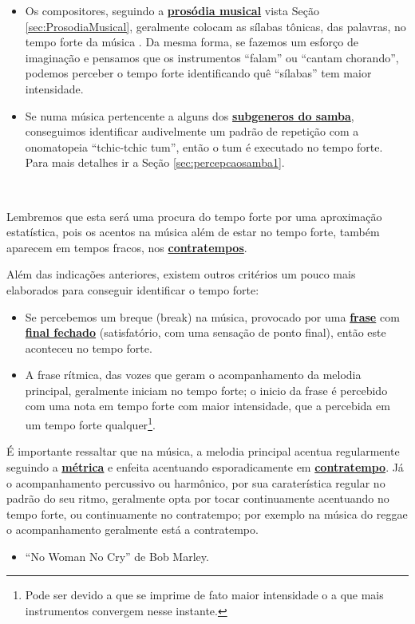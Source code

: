 \begin{itemize}
\item Os compositores, seguindo a \hyperref[sec:ProsodiaMusical]{\textbf{prosódia musical}} vista Seção \ref{sec:ProsodiaMusical}, 
geralmente colocam as sílabas tônicas, das palavras, no tempo forte da música  \cite[pp. 149]{medteoria}. 
Da mesma forma, se fazemos um esforço de imaginação e pensamos que os instrumentos ``falam'' ou ``cantam chorando'',
podemos perceber o tempo forte identificando quê ``sílabas'' tem maior intensidade.
\item Se numa música pertencente a alguns dos \hyperref[sec:FamiliaSamba]{\textbf{subgeneros do samba}}, 
conseguimos identificar audivelmente  um padrão de repetição com a onomatopeia ``tchic-tchic tum'', 
então o tum é executado no tempo forte. 
Para mais detalhes ir a Seção \ref{sec:percepcaosamba1}.
\end{itemize}~

Lembremos que esta será uma procura do tempo forte por uma aproximação estatística, 
pois os acentos na música além de estar no tempo forte, 
também aparecem em tempos fracos, nos \hyperref[sec:contratempo]{\textbf{contratempos}}.




Além das indicações anteriores, 
existem outros critérios um pouco mais elaborados para conseguir identificar o tempo forte:
\begin{itemize}
\item Se percebemos um breque (break) na música, 
provocado por uma \hyperref[sec:Frase]{\textbf{frase}} com \hyperref[subsec:FinalAbertoFechado]{\textbf{final fechado}} 
(satisfatório, com uma sensação de ponto final), então este aconteceu no tempo forte.
\item A frase rítmica, das vozes que geram o acompanhamento da melodia principal,
geralmente iniciam no tempo forte; 
o inicio da frase é percebido com uma nota em tempo forte com maior intensidade, 
que a percebida em um tempo forte qualquer\footnote{Pode ser
devido a que se imprime de fato maior intensidade o a que mais instrumentos convergem nesse instante.}.
\end{itemize}

\begin{tcbattention}
É importante ressaltar que na música, 
a melodia principal acentua regularmente seguindo a \hyperref[def:acentometrico]{\textbf{métrica}}
e enfeita acentuando esporadicamente em \hyperref[sec:contratempo]{\textbf{contratempo}}.
Já o acompanhamento percussivo ou harmônico, por sua caraterística regular no padrão do seu ritmo,
geralmente opta por tocar continuamente acentuando no tempo forte,
ou continuamente no contratempo; 
por exemplo na música do reggae o acompanhamento geralmente está a contratempo.
\begin{itemize}
\item ``No Woman No Cry'' de Bob Marley.
\end{itemize}
\end{tcbattention}




